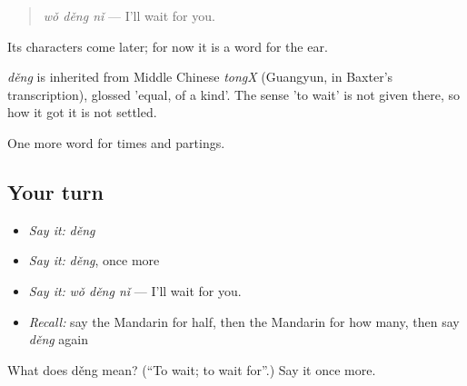 \begin{quote}
\emph{wǒ děng nǐ} — I'll wait for you.
\end{quote}

Its characters come later; for now it is a word for the ear.

\begin{cousinweb}
\emph{děng} is inherited from Middle Chinese \emph{tongX} (Guangyun, in Baxter's transcription), glossed 'equal, of a kind'. The sense 'to wait' is not given there, so how it got it is not settled.
\end{cousinweb}

\begin{grammarlens}[title={What you've built}]
One more word for times and partings.
\end{grammarlens}

\subsection*{Your turn}
\begin{itemize}
\raggedright
  \item \emph{Say it:} \emph{děng}
  \item \emph{Say it:} \emph{děng}, once more
  \item \emph{Say it:} \emph{wǒ děng nǐ} — I'll wait for you.
  \item \emph{Recall:} say the Mandarin for half, then the Mandarin for how many, then say \emph{děng} again
\end{itemize}

\begin{tcolorbox}[breakable,colback=teal!4,colframe=teal!35!black,title={Before you move on}]
What does děng mean? (\textquotedblleft{}To wait; to wait for\textquotedblright{}.) Say it once more.
\end{tcolorbox}
